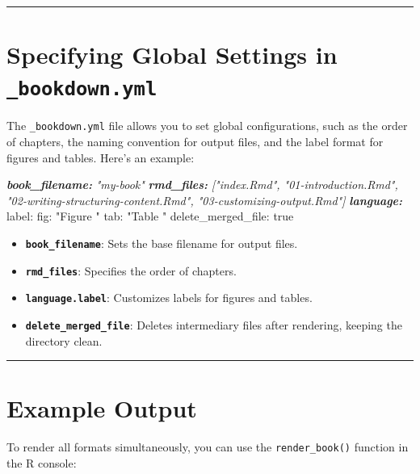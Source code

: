 \documentclass[
]{book}
\newenvironment{Shaded}{\begin{snugshade}}{\end{snugshade}}
\newcommand{\AnnotationTok}[1]{\textcolor[rgb]{0.56,0.35,0.01}{\textbf{\textit{#1}}}}
\newcommand{\CommentTok}[1]{\textcolor[rgb]{0.56,0.35,0.01}{\textit{#1}}}
\newcommand{\NormalTok}[1]{#1}
\providecommand{\tightlist}{%
  \setlength{\itemsep}{0pt}\setlength{\parskip}{0pt}}
\theoremstyle{definition}
\theoremstyle{definition}
\theoremstyle{definition}
\theoremstyle{definition}
\theoremstyle{remark}
\begin{document}
\begin{center}\rule{0.5\linewidth}{0.5pt}\end{center}

\section{\texorpdfstring{Specifying Global Settings in \texttt{\_bookdown.yml}}{Specifying Global Settings in \_bookdown.yml}}\label{specifying-global-settings-in-_bookdown.yml}

The \texttt{\_bookdown.yml} file allows you to set global configurations, such as the order of chapters, the naming convention for output files, and the label format for figures and tables. Here's an example:

\begin{Shaded}
\begin{Highlighting}[]
\AnnotationTok{book\_filename:}\CommentTok{ "my{-}book"}
\AnnotationTok{rmd\_files:}\CommentTok{ ["index.Rmd", "01{-}introduction.Rmd", "02{-}writing{-}structuring{-}content.Rmd", "03{-}customizing{-}output.Rmd"]}
\AnnotationTok{language:}
\NormalTok{  label:}
\NormalTok{    fig: "Figure "}
\NormalTok{    tab: "Table "}
\NormalTok{delete\_merged\_file: true}
\end{Highlighting}
\end{Shaded}

\begin{itemize}
\tightlist
\item
  \textbf{\texttt{book\_filename}}: Sets the base filename for output files.
\item
  \textbf{\texttt{rmd\_files}}: Specifies the order of chapters.
\item
  \textbf{\texttt{language.label}}: Customizes labels for figures and tables.
\item
  \textbf{\texttt{delete\_merged\_file}}: Deletes intermediary files after rendering, keeping the directory clean.
\end{itemize}

\begin{center}\rule{0.5\linewidth}{0.5pt}\end{center}

\section{Example Output}\label{example-output}

To render all formats simultaneously, you can use the \texttt{render\_book()} function in the R console:
\end{document}
